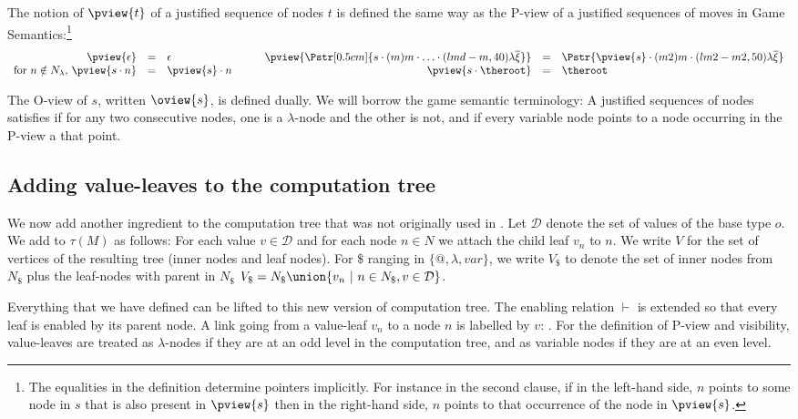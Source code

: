 The notion of  $\pview{t}$ of a justified sequence of nodes $t$ is defined the same way as the P-view of a justified sequences of moves in Game Semantics:\footnote{ The equalities in the
  definition determine pointers implicitly. For instance in the second
  clause, if in the left-hand side, $n$ points to some node in $s$
  that is also present in $\pview{s}$ then in the right-hand side, $n$
  points to that occurrence of the node in $\pview{s}$.}
$$\begin{array}{rclrcl}
\pview{\epsilon} &=&  \epsilon & \pview{\Pstr[0.5cm]{ s \cdot (m) m \cdot \ldots \cdot (lmd-m,40){\lambda\overline{\xi}} }}
 &=& \Pstr{
\pview{s} \cdot (m2) m \cdot (lm2-m2,50) {\lambda \overline{\xi}} } \\
\mbox{for $n \notin N_\lambda$, } \pview{s \cdot n }  &=&  \pview{s} \cdot n \qquad & \pview{s \cdot \theroot }  &=&  \theroot
\end{array}$$

The O-view of $s$, written $\oview{s}$, is defined dually. We will borrow the game semantic terminology: A justified sequences of nodes satisfies  if for any two consecutive nodes, one is a $\lambda$-node and the other is not, and  if every variable node points to a node occurring in the P-view a that point.

\subsection{Adding value-leaves to the computation tree}

We now add another ingredient to the computation tree that was not originally used in \cite{OngLics2006}.  Let $\mathcal{D}$ denote the set of values of the base type $o$.  We add
 to $\tau(M)$ as follows: For each value $v
\in \mathcal{D}$ and for each node $n \in N$ we attach the child leaf $v_n$ to $n$.  We write $V$ for the set of vertices of the resulting tree (\ie inner nodes and leaf nodes). For $\$$ ranging in $\{@, \lambda, var \}$, we write $V_\$$ to denote the set of inner nodes from $N_\$$ plus the leaf-nodes with parent in $N_\$$ \ie $V_\$ = N_\$ \union \{ v_n \ | \ n \in N_\$, v \in \mathcal{D} \}$.


Everything that we have defined can be lifted to this new version of computation tree. The enabling relation $\vdash$ is extended so that every leaf is enabled by its parent node. A link going from a value-leaf $v_n$ to a node $n$ is labelled by $v$: . For the definition of P-view and visibility, value-leaves are treated as $\lambda$-nodes if they are at an odd level in the computation tree, and as variable nodes if they are at an even level.

